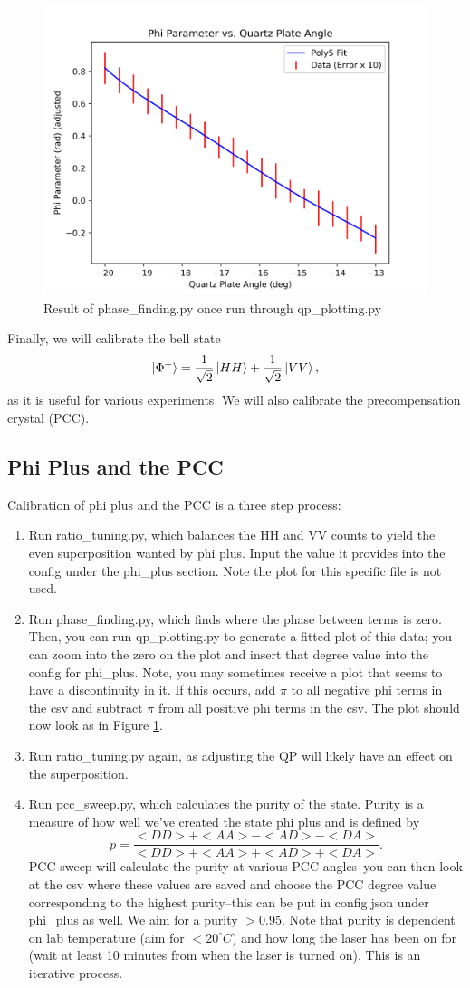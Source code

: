 \documentclass{paper}[11pt]
\begin{document}
\begin{figure}[!]
    \centering
    \includegraphics[width=0.75\linewidth]{figs/phi_sweep_7022024_2.png}
    \caption{Result of phase\_finding.py once run through qp\_plotting.py}
    \label{fig:phase_finding}
\end{figure}
Finally, we will calibrate the bell state $$\ket{\Phi^+} = \frac{1}{\sqrt{2}}\ket{HH} + \frac{1}{\sqrt{2}}\ket{VV},$$ as it is useful for various experiments. We will also calibrate the precompensation crystal (PCC).
\subsection{Phi Plus and the PCC}
Calibration of phi plus and the PCC is a three step process:
\begin{enumerate}
    \item Run ratio\_tuning.py, which balances the HH and VV counts to yield the even superposition wanted by phi plus. Input the value it provides into the config under the phi\_plus section. Note the plot for this specific file is not used.
    \item Run phase\_finding.py, which finds where the phase between terms is zero. Then, you can run qp\_plotting.py to generate a fitted plot of this data; you can zoom into the zero on the plot and insert that degree value into the config for phi\_plus. Note, you may sometimes receive a plot that seems to have a discontinuity in it. If this occurs, add $\pi$ to all negative phi terms in the csv and subtract $\pi$ from all positive phi terms in the csv. The plot should now look as in Figure \ref{fig:phase_finding}.
    \item Run ratio\_tuning.py again, as adjusting the QP will likely have an effect on the superposition. 
    \item Run pcc\_sweep.py, which calculates the purity of the state. Purity is a measure of how well we've created the state phi plus and is defined by $$p = \frac{<DD> + <AA> - <AD> - <DA>}{<DD> + <AA> + <AD> + <DA>}.$$ PCC sweep will calculate the purity at various PCC angles--you can then look at the csv where these values are saved and choose the PCC degree value corresponding to the highest purity--this can be put in config.json under phi\_plus as well. We aim for a purity $>0.95$. Note that purity is dependent on lab temperature (aim for $<20^\circ C$) and how long the laser has been on for (wait at least 10 minutes from when the laser is turned on). This is an iterative process.
\end{enumerate}
\end{document}
